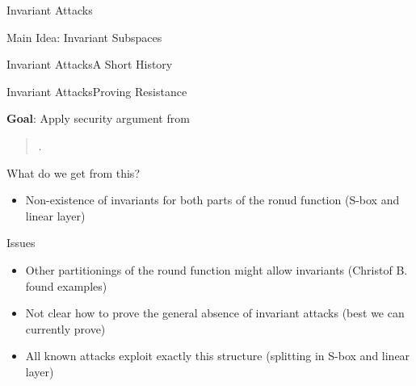 \begin{frame}{Invariant Attacks}
\begin{block}{Main Idea: Invariant Subspaces}
    \end{block}
\end{frame}

\begin{frame}{Invariant Attacks}{A Short History}
\begin{timeline}
\end{timeline}
\end{frame}

\begin{frame}{Invariant Attacks}{Proving Resistance}
    \centering
    \begin{block}{\textbf{Goal}: Apply security argument from}
    \begin{quote}
        .
    \end{quote}
    \end{block}
    \begin{exampleblock}{What do we get from this?}
        \begin{itemize}
            \item Non-existence of invariants for both parts of the ronud function (S-box and linear layer)
        \end{itemize}
    \end{exampleblock}
    \begin{alertblock}{Issues}
    \begin{itemize}
        \item Other partitionings of the round function might allow invariants (Christof B\@. found examples)
        \item Not clear how to prove the general absence of invariant attacks (best we can currently prove)
        \item All known attacks exploit exactly this structure (splitting in S-box and linear layer)
    \end{itemize}
    \end{alertblock}
\end{frame}

